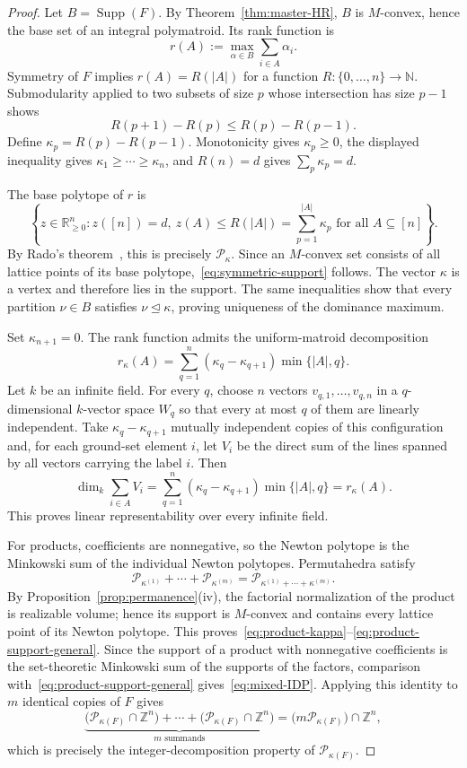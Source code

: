 \documentclass[11pt,a4paper,oneside]{amsart}
\numberwithin{equation}{section}
\theoremstyle{definition}
\theoremstyle{remark}
\DeclareMathOperator{\Supp}{Supp}
\newcommand{\N}{\mathbb N}
\newcommand{\R}{\mathbb R}
\newcommand{\abs}[1]{\lvert#1\rvert}
\begin{document}
\begin{proof}
Let $B=\Supp(F)$.  By Theorem~\ref{thm:master-HR}, $B$ is $M$-convex, hence the base set of an integral polymatroid.  Its rank function is
\[
 r(A):=\max_{\alpha\in B}\sum_{i\in A}\alpha_i.
\]
Symmetry of $F$ implies $r(A)=R(\abs A)$ for a function $R:\{0,\ldots,n\}\to\N$.  Submodularity applied to two subsets of size $p$ whose intersection has size $p-1$ shows
\[
 R(p+1)-R(p)\leq R(p)-R(p-1).
\]
Define $\kappa_p=R(p)-R(p-1)$.  Monotonicity gives $\kappa_p\geq0$, the displayed inequality gives $\kappa_1\geq\cdots\geq\kappa_n$, and $R(n)=d$ gives $\sum_p\kappa_p=d$.

The base polytope of $r$ is
\[
 \left\{z\in\R_{\geq0}^n:
 z([n])=d,\ z(A)\leq R(\abs A)=\sum_{p=1}^{\abs A}\kappa_p
 \text{ for all }A\subseteq[n]\right\}.
\]
By Rado's theorem~\cite{Rado52}, this is precisely $\mathcal P_\kappa$.  Since an $M$-convex set consists of all lattice points of its base polytope,~\eqref{eq:symmetric-support} follows.  The vector $\kappa$ is a vertex and therefore lies in the support.  The same inequalities show that every partition $\nu\in B$ satisfies $\nu\unlhd\kappa$, proving uniqueness of the dominance maximum.

Set $\kappa_{n+1}=0$.  The rank function admits the uniform-matroid decomposition
\begin{equation}\label{eq:uniform-rank-decomposition}
 r_\kappa(A)
 =\sum_{q=1}^n(\kappa_q-\kappa_{q+1})\min\{|A|,q\}.
\end{equation}
Let $k$ be an infinite field.  For every $q$, choose $n$ vectors
$v_{q,1},\ldots,v_{q,n}$ in a $q$-dimensional $k$-vector space $W_q$ so that
every at most $q$ of them are linearly independent.  Take
$\kappa_q-\kappa_{q+1}$ mutually independent copies of this configuration and,
for each ground-set element $i$, let $V_i$ be the direct sum of the lines
spanned by all vectors carrying the label $i$.  Then
\[
 \dim_k\sum_{i\in A}V_i
 =\sum_{q=1}^n(\kappa_q-\kappa_{q+1})\min\{|A|,q\}
 =r_\kappa(A).
\]
This proves linear representability over every infinite field.

For products, coefficients are nonnegative, so the Newton polytope is the Minkowski sum of the individual Newton polytopes.  Permutahedra satisfy
\[
 \mathcal P_{\kappa^{(1)}}+\cdots+\mathcal P_{\kappa^{(m)}}
 =\mathcal P_{\kappa^{(1)}+\cdots+\kappa^{(m)}}.
\]
By Proposition~\ref{prop:permanence}(iv), the factorial normalization of the product is realizable volume; hence its support is $M$-convex and contains every lattice point of its Newton polytope.  This proves~\eqref{eq:product-kappa}--\eqref{eq:product-support-general}.  Since the support of a product with nonnegative coefficients is the set-theoretic Minkowski sum of the supports of the factors, comparison with~\eqref{eq:product-support-general} gives~\eqref{eq:mixed-IDP}.  Applying this identity to $m$ identical copies of $F$ gives
\[
 \underbrace{\bigl(\mathcal P_{\kappa(F)}\cap\mathbb Z^n\bigr)+\cdots+
 \bigl(\mathcal P_{\kappa(F)}\cap\mathbb Z^n\bigr)}_{m\text{ summands}}
 =\bigl(m\mathcal P_{\kappa(F)}\bigr)\cap\mathbb Z^n,
\]
which is precisely the integer-decomposition property of $\mathcal P_{\kappa(F)}$.


\end{proof}
\end{document}
